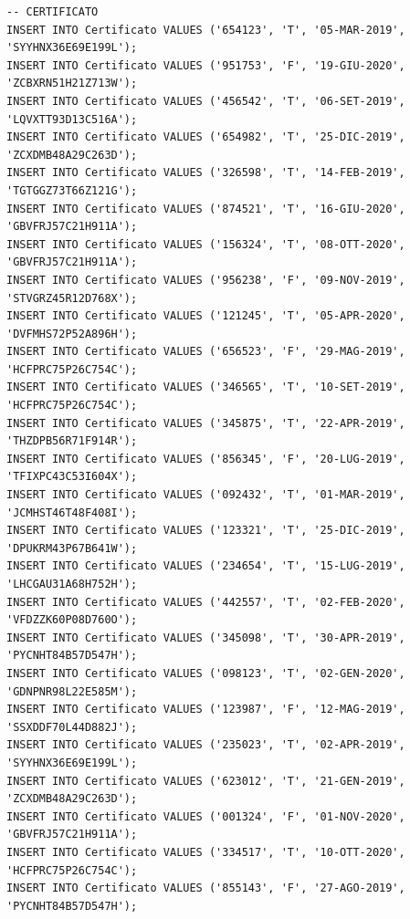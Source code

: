 \documentclass[12pt]{report}
\begin{document}
\begin{scriptsize}
\begin{verbatim}
-- CERTIFICATO
INSERT INTO Certificato VALUES ('654123', 'T', '05-MAR-2019', 'SYYHNX36E69E199L');
INSERT INTO Certificato VALUES ('951753', 'F', '19-GIU-2020', 'ZCBXRN51H21Z713W');
INSERT INTO Certificato VALUES ('456542', 'T', '06-SET-2019', 'LQVXTT93D13C516A');
INSERT INTO Certificato VALUES ('654982', 'T', '25-DIC-2019', 'ZCXDMB48A29C263D');
INSERT INTO Certificato VALUES ('326598', 'T', '14-FEB-2019', 'TGTGGZ73T66Z121G');
INSERT INTO Certificato VALUES ('874521', 'T', '16-GIU-2020', 'GBVFRJ57C21H911A');
INSERT INTO Certificato VALUES ('156324', 'T', '08-OTT-2020', 'GBVFRJ57C21H911A');
INSERT INTO Certificato VALUES ('956238', 'F', '09-NOV-2019', 'STVGRZ45R12D768X');
INSERT INTO Certificato VALUES ('121245', 'T', '05-APR-2020', 'DVFMHS72P52A896H');
INSERT INTO Certificato VALUES ('656523', 'F', '29-MAG-2019', 'HCFPRC75P26C754C');
INSERT INTO Certificato VALUES ('346565', 'T', '10-SET-2019', 'HCFPRC75P26C754C');
INSERT INTO Certificato VALUES ('345875', 'T', '22-APR-2019', 'THZDPB56R71F914R');
INSERT INTO Certificato VALUES ('856345', 'F', '20-LUG-2019', 'TFIXPC43C53I604X');
INSERT INTO Certificato VALUES ('092432', 'T', '01-MAR-2019', 'JCMHST46T48F408I');
INSERT INTO Certificato VALUES ('123321', 'T', '25-DIC-2019', 'DPUKRM43P67B641W');
INSERT INTO Certificato VALUES ('234654', 'T', '15-LUG-2019', 'LHCGAU31A68H752H');
INSERT INTO Certificato VALUES ('442557', 'T', '02-FEB-2020', 'VFDZZK60P08D760O');
INSERT INTO Certificato VALUES ('345098', 'T', '30-APR-2019', 'PYCNHT84B57D547H');
INSERT INTO Certificato VALUES ('098123', 'T', '02-GEN-2020', 'GDNPNR98L22E585M');
INSERT INTO Certificato VALUES ('123987', 'F', '12-MAG-2019', 'SSXDDF70L44D882J');
INSERT INTO Certificato VALUES ('235023', 'T', '02-APR-2019', 'SYYHNX36E69E199L');
INSERT INTO Certificato VALUES ('623012', 'T', '21-GEN-2019', 'ZCXDMB48A29C263D');
INSERT INTO Certificato VALUES ('001324', 'F', '01-NOV-2020', 'GBVFRJ57C21H911A');
INSERT INTO Certificato VALUES ('334517', 'T', '10-OTT-2020', 'HCFPRC75P26C754C');
INSERT INTO Certificato VALUES ('855143', 'F', '27-AGO-2019', 'PYCNHT84B57D547H');


\end{verbatim}
\end{scriptsize}
\end{document}
